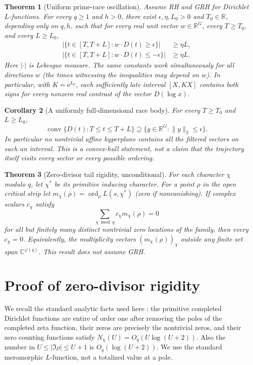 \documentclass[11pt]{article}
\newtheorem{theorem}{Theorem}
\newtheorem{corollary}[theorem]{Corollary}
\newcommand{\R}{\mathbb R}\newcommand{\C}{\mathbb C}\newcommand{\Z}{\mathbb Z}\newcommand{\e}{\mathrm e}\newcommand{\dd}{\,\mathrm d}\newcommand{\id}{\mathrm I}\newcommand{\ord}{\operatorname{ord}}\newcommand{\Rea}{\operatorname{Re}}\newcommand{\conv}{\operatorname{conv}}\newcommand{\norm}[1]{\lVert#1\rVert}\newcommand{\ph}{\varphi(q)}
\begin{document}
\begin{theorem}[Uniform prime-race oscillation]\label{thm:main}
Assume RH and GRH for Dirichlet $L$-functions. For every $q\ge 1$ and $h>0$, there exist $\epsilon,\eta,L_0>0$ and $T_0\in\R$, depending only on $q,h$, such that for every real unit vector $w\in\R^G$, every $T\ge T_0$, and every $L\ge L_0$,
\begin{align}
 \left|\{t\in[T,T+L]:w\cdot D(t)\ge\epsilon\}\right|&\ge\eta L,\label{eq:positive}\\
 \left|\{t\in[T,T+L]:w\cdot D(t)\le-\epsilon\}\right|&\ge\eta L.\label{eq:negative}
\end{align}
Here $|\cdot|$ is Lebesgue measure. The same constants work simultaneously for all directions $w$ (the times witnessing the inequalities may depend on $w$). In particular, with $K=\e^{L_0}$, each sufficiently late interval $[X,KX]$ contains both signs for every nonzero real contrast of the vector $D(\log x)$.
\end{theorem}

\begin{corollary}[A uniformly full-dimensional race body]\label{cor:convex}
For every $T\ge T_0$ and $L\ge L_0$,
\[
 \conv\{D(t):T\le t\le T+L\}\supseteq \{y\in\R^G:\norm{y}_2\le\epsilon\}.
\]
In particular no nontrivial affine hyperplane contains all the filtered vectors on such an interval. This is a convex-hull statement, not a claim that the trajectory itself visits every sector or every possible ordering.
\end{corollary}

\begin{theorem}[Zero-divisor tail rigidity, unconditional]\label{thm:rigidity}
For each character $\chi$ modulo $q$, let $\chi^*$ be its primitive inducing character. For a point $\rho$ in the open critical strip let $m_\chi(\rho)=\ord_\rho L(s,\chi^*)$ (zero if nonvanishing). If complex scalars $c_\chi$ satisfy
\[
 \sum_{\chi\bmod q}c_\chi m_\chi(\rho)=0
\]
for all but finitely many distinct nontrivial zero locations of the family, then every $c_\chi=0$. Equivalently, the multiplicity vectors $(m_\chi(\rho))_\chi$ outside any finite set span $\C^{\ph}$. This result does not assume GRH.
\end{theorem}

\section{Proof of zero-divisor rigidity}
We recall the standard analytic facts used here \cite{davenport,mv}: the primitive completed Dirichlet functions are entire of order one after removing the poles of the completed zeta function, their zeros are precisely the nontrivial zeros, and their zero counting functions satisfy $N_\chi(U)=O_q(U\log(U+2))$. Also the number in $U\le |\Im\rho|\le U+1$ is $O_q(\log(U+2))$. We use the standard meromorphic $L$-function, not a totalized value at a pole.
\end{document}
